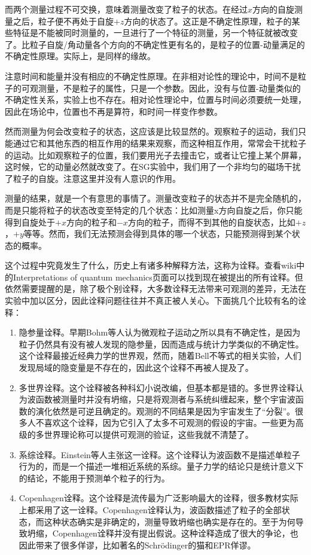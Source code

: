 \documentclass{ctexart}
\begin{document}
而两个测量过程不可交换，意味着测量改变了粒子的状态。在经过$x$方向的自旋测量之后，粒子便不再处于自旋$+z$方向的状态了。这正是不确定性原理，粒子的某些特征是不能被同时测量的，一旦进行了一个特征的测量，另一个特征就被改变了。比粒子自旋/角动量各个方向的不确定性更有名的，是粒子的位置-动量满足的不确定性原理。实际上，是同样的缘故。

注意时间和能量并没有相应的不确定性原理。在非相对论性的理论中，时间不是粒子的可观测量，不是粒子的属性，只是一个参数。因此，没有与位置-动量类似的不确定性关系，实验上也不存在。相对论性理论中，位置与时间必须要统一处理，因此在场论中，位置也不再是算符，和时间一样变作参数。

然而测量为何会改变粒子的状态，这应该是比较显然的。观察粒子的运动，我们只能通过它和其他东西的相互作用的结果来观察，而这种相互作用，常常会干扰粒子的运动。比如观察粒子的位置，我们要用光子去撞击它，或者让它撞上某个屏幕，这时候，它的动量必然就改变了。在SG实验中，我们用了一个非均匀的磁场干扰了粒子的自旋。注意这里并没有人意识的作用。

测量的结果，就是一个有意思的事情了。测量改变粒子的状态并不是完全随机的，而是只能将粒子的状态改变至特定的几个状态：比如测量x方向自旋之后，你只能得到自旋处于$+x$方向的粒子和$-x$方向的粒子，而得不到其他的自旋状态，比如$+z$，$+y$等等。然而，我们无法预测会得到具体的哪一个状态，只能预测得到某个状态的概率。

这个过程中究竟发生了什么，历史上有诸多种解释方法，这称为诠释。查看wiki中的Interpretations of quantum mechanics页面可以找到现在被提出的所有诠释。但依然需要提醒的是，除了极个别诠释，大多数诠释无法带来可观测的差异，无法在实验中加以区分，因此诠释问题往往并不真正被人关心。下面挑几个比较有名的诠释：

\begin{enumerate}

\item 隐参量诠释。早期Bohm等人认为微观粒子运动之所以具有不确定性，是因为粒子仍然具有没有被人发现的隐参量，因而造成与统计力学类似的不确定性。这个诠释最接近经典力学的世界观，然而，随着Bell不等式的相关实验，人们发现局域的隐变量是不存在的，因此这个诠释不再被人提及了。

\item 多世界诠释。这个诠释被各种科幻小说改编，但基本都是错的。多世界诠释认为波函数被测量时并没有坍缩，只是将观测者与系统纠缠起来，整个宇宙波函数的演化依然是可逆且确定的。观测的不同结果是因为宇宙发生了“分裂”。很多人不喜欢这个诠释，因为它引入了太多不可观测的假设的宇宙。一些更为高级的多世界理论称可以提供可观测的验证，这些我就不清楚了。

\item 系综诠释。Einstein等人主张这一诠释。这个诠释认为波函数不是描述单粒子行为的，而是一个描述一堆相近系统的系综。量子力学的结论只是统计意义下的结论，不能用于预测单个粒子的行为。

\item Copenhagen诠释。这个诠释是流传最为广泛影响最大的诠释，很多教材实际上都采用了这一诠释。Copenhagen诠释认为，波函数描述了粒子的全部状态，而这种状态确实是非确定的，测量导致坍缩也确实是存在的。至于为何导致坍缩，Copenhagen诠释并没有提出假说。这种诠释造成了很大的争论，也因此带来了很多佯谬，比如著名的Schrödinger的猫和EPR佯谬。
\end{enumerate}
\end{document}
